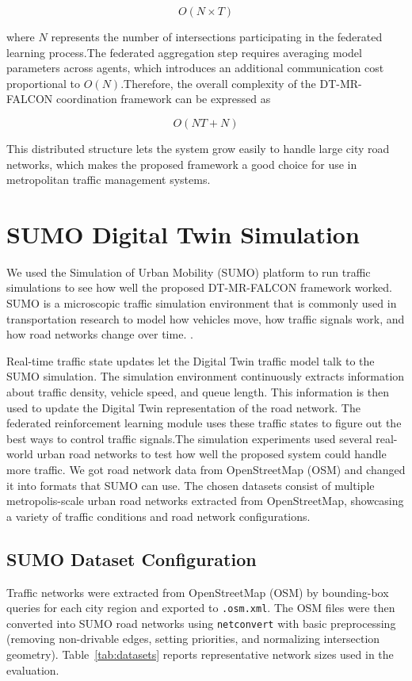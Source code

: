 \documentclass[conference]{IEEEtran}
\begin{document}
\[
O(N \times T)
\]

where $N$ represents the number of intersections participating in the federated learning process.The federated aggregation step requires averaging model parameters across agents, which introduces an additional communication cost proportional to $O(N)$.Therefore, the overall complexity of the DT-MR-FALCON coordination framework can be expressed as

\[
O(NT + N)
\]

This distributed structure lets the system grow easily to handle large city road networks, which makes the proposed framework a good choice for use in metropolitan traffic management systems.

\section{SUMO Digital Twin Simulation}
We used the Simulation of Urban Mobility (SUMO) platform to run traffic simulations to see how well the proposed DT-MR-FALCON framework worked. SUMO is a microscopic traffic simulation environment that is commonly used in transportation research to model how vehicles move, how traffic signals work, and how road networks change over time. \cite{b32}.

Real-time traffic state updates let the Digital Twin traffic model talk to the SUMO simulation. The simulation environment continuously extracts information about traffic density, vehicle speed, and queue length. This information is then used to update the Digital Twin representation of the road network. The federated reinforcement learning module uses these traffic states to figure out the best ways to control traffic signals.The simulation experiments used several real-world urban road networks to test how well the proposed system could handle more traffic. We got road network data from OpenStreetMap (OSM) and changed it into formats that SUMO can use. The chosen datasets consist of multiple metropolis-scale urban road networks extracted from OpenStreetMap, showcasing a variety of traffic conditions and road network configurations.

\subsection{SUMO Dataset Configuration}
Traffic networks were extracted from OpenStreetMap (OSM) by bounding-box queries for each city region and exported to \texttt{.osm.xml}. The OSM files were then converted into SUMO road networks using \texttt{netconvert} with basic preprocessing (removing non-drivable edges, setting priorities, and normalizing intersection geometry). Table~\ref{tab:datasets} reports representative network sizes used in the evaluation.
\end{document}

